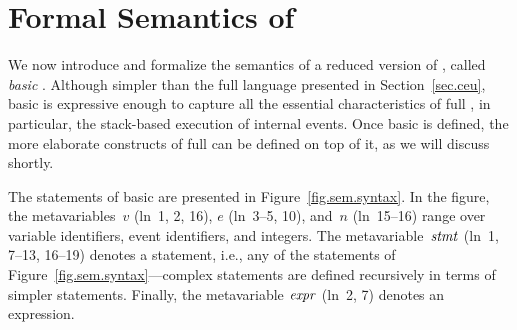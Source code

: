 \section{Formal Semantics of \CEU}
\label{sec.sem}

We now introduce and formalize the semantics of a reduced version of \CEU,
called \emph{basic \CEU}.  Although simpler than the full language presented
in Section~\ref{sec.ceu}, basic \CEU is expressive enough to capture all the
essential characteristics of full \CEU, in particular, the stack-based
execution of internal events.  Once basic \CEU is defined, the more
elaborate constructs of full \CEU can be defined on top of it, as we will
discuss shortly.

The statements of basic \CEU are presented in Figure~\ref{fig.sem.syntax}.
In the figure, the metavariables~$v$ (ln~1, 2, 16), $e$ (ln~3--5, 10),
and~$n$ (ln~15--16) range over variable identifiers, event identifiers, and
integers.  The metavariable~$\mathit{stmt}$ (ln~1, 7--13, 16--19) denotes a
statement, i.e., any of the statements of
Figure~\ref{fig.sem.syntax}---complex statements are defined recursively in
terms of simpler statements.  Finally, the metavariable $\mathit{expr}$ (ln~2, 7)
denotes an expression.

